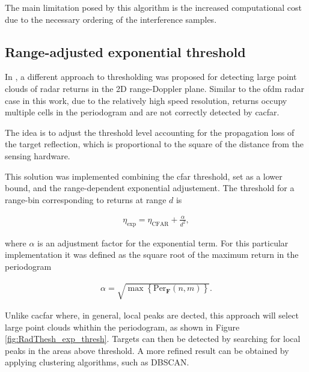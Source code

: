The main limitation posed by this algorithm is the increased computational cost due to the necessary ordering of the interference samples.


\subsection{Range-adjusted exponential threshold}

	
	In \cite{Wagner_Feger_Stelzer_2017}, a different approach to thresholding was proposed for detecting large point clouds of radar returns in the 2D range-Doppler plane. Similar to the \gls{ofdm} radar case in this work, due to the relatively high speed resolution, returns occupy multiple cells in the periodogram and are not correctly detected by \gls{cacfar}.
	
	The idea is to adjust the threshold level accounting for the propagation loss of the target reflection, which is proportional to the square of the distance from the sensing hardware. 
	
	This solution was implemented combining the \gls{cfar} threshold, set as a lower bound, and the range-dependent exponential adjustement.
	The threshold for a range-bin corresponding to returns at range $d$ is
	
	\begin{align*}
		\eta_{\text{exp}} = \eta_{\text{CFAR}} + \frac{\alpha}{d^2},
	\end{align*} 
	
	where $\alpha$ is an adjustment factor for the exponential term. For this particular implementation it was defined as the square root of the maximum return in the periodogram
	
	\begin{align*}
		\alpha = \sqrt{\max{ \left\{\text{Per}_{\mathbf F}(n,m)\right\} }}.
	\end{align*}
	
	Unlike \gls{cacfar} where, in general, local peaks are dected, this approach will select large point clouds whithin the periodogram, as shown in Figure \ref{fig:RadThesh_exp_thresh}.
	Targets can then be detected by searching for local peaks in the areas above threshold. A more refined result can be obtained by applying clustering algorithms, such as DBSCAN.
	
